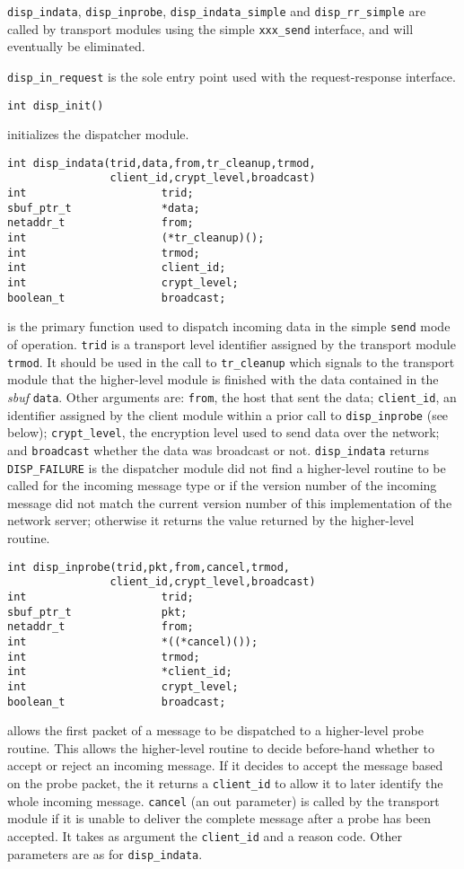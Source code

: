 \verb"disp_indata", \verb"disp_inprobe", \verb"disp_indata_simple" and
\verb"disp_rr_simple" are called by transport modules using the simple
\verb"xxx_send" interface, and will eventually be eliminated. 

\verb"disp_in_request" is the sole entry point used with the 
request-response interface.

\begin{verbatim}
int disp_init()
\end{verbatim}
initializes the dispatcher module.

\begin{verbatim}
int disp_indata(trid,data,from,tr_cleanup,trmod,
                client_id,crypt_level,broadcast)
int                     trid;
sbuf_ptr_t              *data;
netaddr_t               from;
int                     (*tr_cleanup)();
int                     trmod;
int                     client_id;
int                     crypt_level;
boolean_t               broadcast;
\end{verbatim}
is the primary function used to dispatch incoming data in the simple
\verb"send" mode of operation.  \verb"trid" is a
transport level identifier assigned by the transport module
\verb"trmod".  It should be used in the call to \verb"tr_cleanup"
which signals to the transport module that the higher-level module is
finished with the data contained in the {\it sbuf} \verb"data".  Other
arguments are: \verb"from", the host that sent the data;
\verb"client_id", an identifier assigned by the client module within a
prior call to \verb"disp_inprobe" (see below);
\verb"crypt_level", the encryption level used to send data over the network;
and \verb"broadcast" whether the data was broadcast or not.
\verb"disp_indata" returns \verb"DISP_FAILURE" is the dispatcher module did
not find a higher-level routine to be called for the incoming message
type or if the version number of the incoming message did not match
the current version number of this implementation of the network server;
otherwise it returns the value returned by the higher-level routine.

\begin{verbatim}
int disp_inprobe(trid,pkt,from,cancel,trmod,
                client_id,crypt_level,broadcast)
int                     trid;
sbuf_ptr_t              pkt;
netaddr_t               from;
int                     *((*cancel)());
int                     trmod;
int                     *client_id;
int                     crypt_level;
boolean_t               broadcast;
\end{verbatim}
allows the first packet of a message to be dispatched to a higher-level
probe routine.  This allows the higher-level routine to decide before-hand
whether to accept or reject an incoming message.  If it decides to accept
the message based on the probe packet, the it returns a \verb"client_id" to
allow it to later identify the whole incoming message.  \verb"cancel" (an
out parameter) is called by the transport module if it is unable to deliver
the complete message after a probe has been accepted.  It takes as argument
the \verb"client_id" and a reason code.  Other parameters are as for
\verb"disp_indata".

